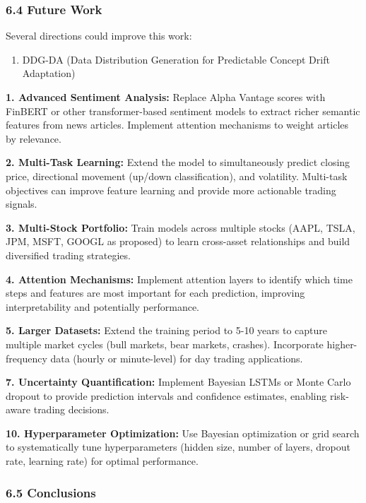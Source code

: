 \documentclass[
]{article}
\begin{document}
\subsubsection{6.4 Future Work}\label{64-future-work}

Several directions could improve this work:

\begin{enumerate}
\def\labelenumi{\arabic{enumi}.}
\item
  DDG-DA (Data Distribution Generation for Predictable Concept Drift
  Adaptation)
\end{enumerate}

\textbf{1. Advanced Sentiment Analysis:} Replace Alpha Vantage scores
with FinBERT or other transformer-based sentiment models to extract
richer semantic features from news articles. Implement attention
mechanisms to weight articles by relevance.

\textbf{2. Multi-Task Learning:} Extend the model to simultaneously
predict closing price, directional movement (up/down classification),
and volatility. Multi-task objectives can improve feature learning and
provide more actionable trading signals.

\textbf{3. Multi-Stock Portfolio:} Train models across multiple stocks
(AAPL, TSLA, JPM, MSFT, GOOGL as proposed) to learn cross-asset
relationships and build diversified trading strategies.

\textbf{4. Attention Mechanisms:} Implement attention layers to identify
which time steps and features are most important for each prediction,
improving interpretability and potentially performance.

\textbf{5. Larger Datasets:} Extend the training period to 5-10 years to
capture multiple market cycles (bull markets, bear markets, crashes).
Incorporate higher-frequency data (hourly or minute-level) for day
trading applications.

\textbf{7. Uncertainty Quantification:} Implement Bayesian LSTMs or
Monte Carlo dropout to provide prediction intervals and confidence
estimates, enabling risk-aware trading decisions.

\textbf{10. Hyperparameter Optimization:} Use Bayesian optimization or
grid search to systematically tune hyperparameters (hidden size, number
of layers, dropout rate, learning rate) for optimal performance.

\subsubsection{6.5 Conclusions}\label{65-conclusions}
\end{document}
